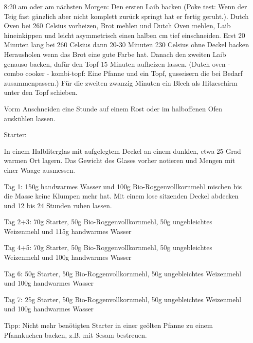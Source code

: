 { 8:20 am oder am nächsten Morgen: Den ersten Laib backen (Poke test: Wenn der Teig fast gänzlich aber nicht komplett zurück springt hat er fertig geruht.). Dutch Oven bei 260 Celsius vorheizen, Brot mehlen und Dutch Oven mehlen, Laib hineinkippen und leicht asymmetrisch einen halben cm tief einschneiden. Erst 20 Minuten lang bei 260 Celsius dann 20-30 Minuten 230 Celsius ohne Deckel backen Herausholen wenn das Brot eine gute Farbe hat. Danach den zweiten Laib genauso backen, dafür den Topf 15 Minuten aufheizen lassen. (Dutch oven - combo cooker - kombi-topf: Eine Pfanne
 und ein Topf, gusseisern die bei Bedarf zusammenpassen.)
Für die zweiten zwanzig Minuten ein Blech als Hitzeschirm unter den Topf schieben.

Vorm Anschneiden eine Stunde auf einem Rost oder im halboffenen Ofen auskühlen lassen.

Starter:

In einem Halbliterglas mit aufgelegtem Deckel an einem dunklen, etwa 25 Grad warmen Ort lagern.
Das Gewicht des Glases vorher notieren und Mengen mit einer Waage ausmessen.

Tag 1:
150g handwarmes Wasser und
100g Bio-Roggenvollkornmehl mischen bis die Masse keine Klumpen mehr hat. Mit einem lose sitzenden Deckel abdecken und 12 bis 24 Stunden ruhen lassen.

Tag 2+3:
70g Starter,
50g Bio-Roggenvollkornmehl,
50g ungebleichtes Weizenmehl und
115g handwarmes Wasser

Tag 4+5:
70g Starter,
50g Bio-Roggenvollkornmehl,
50g ungebleichtes Weizenmehl und
100g handwarmes Wasser

Tag 6:
50g Starter,
50g Bio-Roggenvollkornmehl,
50g ungebleichtes Weizenmehl und
100g handwarmes Wasser

Tag 7:
25g Starter,
50g Bio-Roggenvollkornmehl,
50g ungebleichtes Weizenmehl und
100g handwarmes Wasser

Tipp: Nicht mehr benötigten Starter in einer geölten Pfanne zu einem Pfannkuchen backen, z.B. mit Sesam bestreuen.
}

